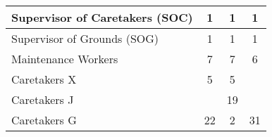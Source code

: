 \begin{tabular}{l|c|c|c|}
        \multicolumn{1}{|l|}{\cellcolor{ccfuschialight}Supervisor of Caretakers (SOC)} & 1                                                      & 1                                                                & 1                                                      \\ \hline
        \multicolumn{1}{|l|}{\cellcolor{ccfuschialight}Supervisor of Grounds (SOG)}    & 1                                                      & 1                                                                & 1                                                      \\ \hline
        \multicolumn{1}{|l|}{\cellcolor{ccfuschialight}Maintenance Workers}            & 7                                                      & 7                                                                & 6                                                       \\ \hline
        \multicolumn{1}{|l|}{\cellcolor{ccfuschialight}Caretakers X}                   & 5                                                      & 5                                                                &                                                       \\ \cline{1-3}
        \multicolumn{1}{|l|}{\cellcolor{ccfuschialight}Caretakers J\tnote{1}}                   &                                                       & 19                                                                &                                                         \\ \cline{1-1} \cline{3-3}
        \multicolumn{1}{|l|}{\cellcolor{ccfuschialight}Caretakers G}                   & \multirow{-2}{*}{22}                                                      & 2                                     & \multirow{-3}{*}{31}                           \\ \hline
        \end{tabular}
        
        